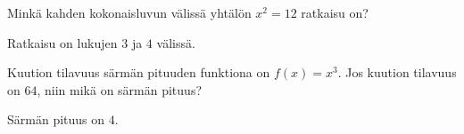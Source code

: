 \begin{tehtava}
Minkä kahden kokonaisluvun välissä yhtälön $x^2 = 12$ ratkaisu on?
\begin{vastaus}
Ratkaisu on lukujen $3$ ja $4$ välissä.
\end{vastaus}
\end{tehtava}
\begin{tehtava}
Kuution tilavuus särmän pituuden funktiona on $f(x) = x^3$. Jos kuution tilavuus on $64$, niin mikä on särmän pituus?
\begin{vastaus}
Särmän pituus on $4$.
\end{vastaus}
\end{tehtava}
